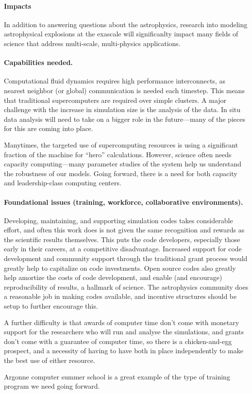 \documentclass[11pt]{article}
\begin{document}
\paragraph*{Impacts} In addition to answering questions about the 
astrophysics, research into modeling astrophysical explosions
at the exascale will significanlty impact many fields of science 
that address multi-scale, multi-physics applications. 




\paragraph*{Capabilities needed.}  Computational fluid dynamics requires 
high performance interconnects, as nearest neighbor (or global)
communication is needed each timestep.  This means that traditional
supercomputers are required over simple clusters.  A major challenge
with the increase in simulation size is the analysis of the data.  In
situ data analysis will need to take on a bigger role in the future---many
of the pieces for this are coming into place.

Manytimes, the targeted use of supercomputing resources is using a
significant fraction of the machine for ``hero'' calculations.
However, science often needs capacity computing---many parameter
studies of the system help us understand the robustness of our models.
Going forward, there is a need for both capacity and leadership-class
computing centers.


\paragraph*{Foundational issues (training, workforce, collaborative environments).}

Developing, maintaining, and supporting simulation codes takes
considerable effort, and often this work does is not given the same
recognition and rewards as the scientific results themselves.  This
puts the code developers, especially those early in their careers, at
a competitive disadvantage. Increased support for code development and
community support through the traditional grant process would greatly
help to capitalize on code investments.  Open source codes also greatly
help amortize the costs of code development, and enable (and
encourage) reproducibility of results, a hallmark of science.  The
astrophysics community does a reasonable job in making codes available, and
incentive structures should be setup to further encourage this.

A further difficulty is that awards of computer time don't come with
monetary support for the researchers who will run and analyse the
simulations, and grants don't come with a guarantee of computer time,
so there is a chicken-and-egg prospect, and a necessity of having to
have both in place independently to make the best use of either
resource.

Argonne computer summer school is a great example of the type of training program we
need going forward.
\end{document}
